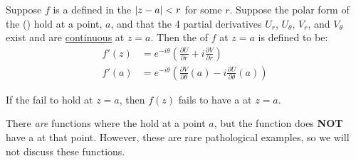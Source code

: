 \begin{theorem}\label{thm:Cauchy_Riemann_Complex_Function_Derivative-Polar}
  Suppose $f$ is a  defined in the  $\lvert z-a \rvert < r$ for some $r$.
  Suppose the polar form of the  () hold at a point, $a$, and that the 4 partial derivatives $U_{r}$, $U_{\theta}$, $V_{r}$, and $V_{\theta}$ exist and are \underline{continuous} at $z=a$.
  Then the  of $f$ at $z=a$ is defined to be:
  \begin{equation}\label{eq:Complex_Function_Derivative-Cauchy_Riemann_Equation_Solution}
    \begin{aligned}
      f'(z) &= e^{-i \theta} \left( \frac{\partial U}{\partial r} + i \frac{\partial V}{\partial r} \right) \\
      f'(a) &= e^{-i \theta} \left( \frac{\partial V}{\partial \theta}(a) - i \frac{\partial U}{\partial \theta}(a) \right)
    \end{aligned}
  \end{equation}
\end{theorem}

\begin{remark*}
  If the  fail to hold at $z = a$, then $f(z)$ fails to have a  at $z = a$.
\end{remark*}

\begin{remark*}
  There \textit{are} functions where the  hold at a point $a$, but the function does \textbf{NOT} have a  at that point.
  However, these are rare pathological examples, so we will not discuss these functions.
\end{remark*}

